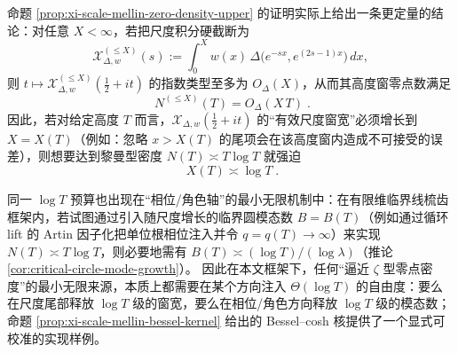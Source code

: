 \begin{remark}\label{rem:xi-scale-mellin-logT-budget}
命题 \ref{prop:xi-scale-mellin-zero-density-upper} 的证明实际上给出一条更定量的结论：对任意 \(X<\infty\)，若把尺度积分硬截断为
\[
\mathcal X_{\Delta,w}^{(\le X)}(s):=\int_{0}^{X} w(x)\,\Delta\!\bigl(e^{-sx},e^{(2s-1)x}\bigr)\,dx,
\]
则 \(t\mapsto \mathcal X_{\Delta,w}^{(\le X)}(\tfrac12+it)\) 的指数类型至多为 \(O_\Delta(X)\)，从而其高度窗零点数满足
\[
\boxed{\;N^{(\le X)}(T)=O_\Delta(X\,T)\; }.
\]
因此，若对给定高度 \(T\) 而言，\(\mathcal X_{\Delta,w}(\tfrac12+it)\) 的“有效尺度窗宽”必须增长到 \(X=X(T)\)（例如：忽略 \(x>X(T)\) 的尾项会在该高度窗内造成不可接受的误差），则想要达到黎曼型密度 \(N(T)\asymp T\log T\) 就强迫
\[
\boxed{\;X(T)\asymp \log T\; }.
\]
\par
同一 \(\log T\) 预算也出现在“相位/角色轴”的最小无限机制中：在有限维临界线梳齿框架内，若试图通过引入随尺度增长的临界圆模态数 \(B=B(T)\)（例如通过循环 lift 的 Artin 因子化把单位根相位注入并令 \(q=q(T)\to\infty\)）来实现 \(N(T)\asymp T\log T\)，则必要地需有 \(B(T)\asymp (\log T)/(\log\lambda)\)（推论 \ref{cor:critical-circle-mode-growth}）。
因此在本文框架下，任何“逼近 \(\zeta\) 型零点密度”的最小无限来源，本质上都需要在某个方向注入 \(\Theta(\log T)\) 的自由度：要么在尺度尾部释放 \(\log T\) 级的窗宽，要么在相位/角色方向释放 \(\log T\) 级的模态数；命题 \ref{prop:xi-scale-mellin-bessel-kernel} 给出的 Bessel--cosh 核提供了一个显式可校准的实现样例。
\end{remark}

